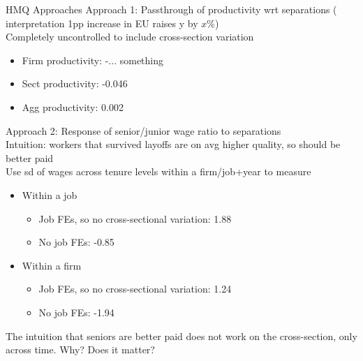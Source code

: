 \documentclass[9pt,aspectratio=169]{beamer} %
\begin{document}
\begin{frame}[noframenumbering]{HMQ Approaches}
Approach 1: Passthrough of productivity wrt separations ( interpretation 1pp increase in EU raises y by $x\%$) \\
Completely uncontrolled to include cross-section variation
\begin{itemize}
    \item Firm productivity: -... something
    \item Sect productivity: -0.046
    \item Agg productivity: 0.002
\end{itemize}
Approach 2: Response of senior/junior wage ratio to separations \\
Intuition: workers that survived layoffs are on avg higher quality, so should be better paid  \\
Use sd of wages across tenure levels within a firm/job+year to measure
\begin{itemize}
    \item Within a job
    \begin{itemize}
        \item Job FEs, so no cross-sectional variation: 1.88
        \item No job FEs: -0.85 
    \end{itemize}
    \item Within a firm
    \begin{itemize}
        \item Job FEs, so no cross-sectional variation: 1.24
        \item No job FEs: -1.94
    \end{itemize}
\end{itemize}
The intuition that seniors are better paid does not work on the cross-section, only across time. Why? Does it matter?
\end{frame}
\end{document}
